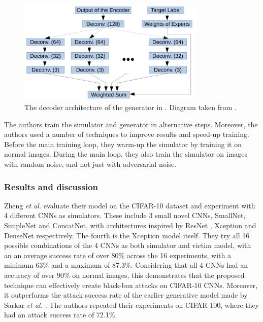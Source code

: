\begin{figure}[h]
    \centering
    \includegraphics[width=0.8\textwidth]{graphics/decoder.PNG}
    \caption{The decoder architecture of the generator in \cite{zheng_black_box_GAN}. Diagram taken from \cite{zheng_black_box_GAN}.}
    \label{fig:zheng_decoder}
\end{figure}

The authors train the simulator and generator in alternative steps. Moreover, the authors used a number of techniques to improve results and speed-up training. Before the main training loop, they warm-up the simulator by training it on normal images. During the main loop, they also train the simulator on images with random noise, and not just with adversarial noise.

\subsubsection{Results and discussion}

Zheng \textit{et al.} \cite{zheng_black_box_GAN} evaluate their model on the CIFAR-10 dataset and experiment with 4 different CNNs as simulators. These include 3 small novel CNNs, SmallNet, SimpleNet and ConcatNet, with architectures inspired by ResNet \cite{resnet}, Xception \cite{xception} and DenseNet \cite{densenet} respectively. The fourth is the Xception model \cite{xception} itself. They try all 16 possible combinations of the 4 CNNs as both simulator and victim model, with an an average success rate of over 80\% across the 16 experiments, with a minimum 63\% and a maximum of 87.3\%. Considering that all 4 CNNs had an accuracy of over 90\% on normal images, this demonstrates that the proposed technique can effectively create black-box attacks on CIFAR-10 CNNs. Moreover, it outperforms the attack success rate of the earlier generative model made by Sarkar \textit{et al.} \cite{upset_angri}. The authors repeated their experiments on CIFAR-100, where they had an attack success rate of 72.1\%.

